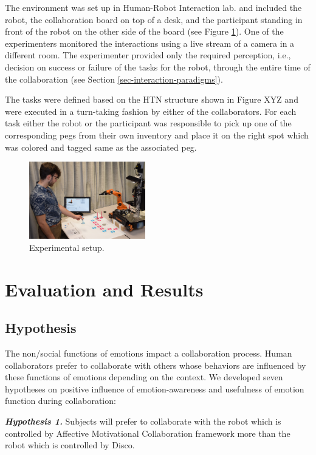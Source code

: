 \documentclass{sig-alternate-05-2015}
\begin{document}
The environment was set up in Human-Robot Interaction lab. and included the
robot, the collaboration board on top of a desk, and the participant standing in
front of the robot on the other side of the board (see Figure
\ref{fig:environment}). One of the experimenters monitored the interactions
using a live stream of a camera in a different room. The experimenter provided
only the required perception, i.e., decision on success or failure of the tasks
for the robot, through the entire time of the collaboration (see Section
\ref{sec-interaction-paradigms}).

The tasks were defined based on the HTN structure shown in Figure XYZ and were
executed in a turn-taking fashion by either of the collaborators. For each task
either the robot or the participant was responsible to pick up one of the
corresponding pegs from their own inventory and place it on the right spot which
was colored and tagged same as the associated peg.

\begin{figure}
  \centering
  \includegraphics[width=0.45\textwidth]{figure/environment.png}
  \caption{{\fontsize{9}{9}\selectfont Experimental setup.}}
  \label{fig:environment}
\end{figure}

\section{Evaluation and Results}

\subsection{Hypothesis}

The non/social functions of emotions impact a collaboration process. Human
collaborators prefer to collaborate with others whose behaviors are influenced
by these functions of emotions depending on the context. We developed seven
hypotheses on positive influence of emotion-awareness and usefulness of emotion
function during collaboration:

\textit{\textbf{Hypothesis 1.}} Subjects will prefer to collaborate with the
robot which is controlled by Affective Motivational Collaboration framework more
than the robot which is controlled by Disco.
\end{document}
